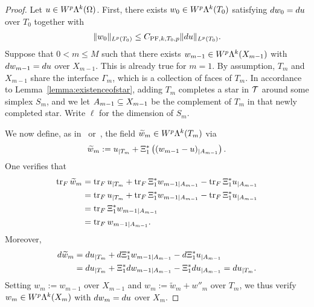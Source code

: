 \documentclass[10pt,a4paper]{article}
\begin{document}
\begin{proof}
    Let $u \in W^{p}\Lambda^{k}(\Omega)$. 
    First, there exists $w_0 \in W^{p}\Lambda^{k}(T_{0})$ satisfying $d w_0 = d u$ over $T_{0}$ together with 
    \begin{gather*}
        \| w_0 \|_{L^{p}(T_{0})} \leq C_{{{\rm PF}},k,T_{0},p} \| d u \|_{L^{p}(T_{0})}.
    \end{gather*}
    Suppose that $0 < m \leq M$ such that there exists $w_{m-1} \in W^{p}\Lambda^{k}(X_{m-1})$ with $d w_{m-1} = d u$ over $X_{m-1}$. 
    This is already true for $m = 1$.
    By assumption, $T_{m}$ and $X_{m-1}$ share the interface $\Gamma_{m}$, which is a collection of faces of $T_{m}$. 
    In accordance to Lemma~\ref{lemma:existenceofstar}, adding $T_{m}$ completes a star in ${\mathcal T}$ around some simplex $S_{m}$, 
    and we let $A_{m-1} \subseteq X_{m-1}$ be the complement of $T_{m}$ in that newly completed star. 
    Write $\ell$ for the dimension of $S_{m}$.
    
    We now define, as in~\cite[Equations~{\char`\(}5.12{\char`\)} and~{\char`\(}5.14{\char`\)}]{ern2020stable} or~\cite[Equations~{\char`\(}6.7{\char`\)} and~{\char`\(}6.9{\char`\)}]{Chaum_Voh_p_rob_3D_H_curl_24}, the field $\widetilde w_{m} \in W^{p}\Lambda^{k}(T_{m})$ via 
    \begin{align}\label{equation:w''_ext_der}
        {\widetilde w}_{m} := u_{|T_m} + \Xi_{1}^{\ast}\left( (w_{m-1} - u)_{|A_{m-1} } \right).
    \end{align}
    One verifies that 
    \begin{align*}
        \operatorname{tr}_F {\widetilde w}_{m} 
        &
        = 
        \operatorname{tr}_F u_{|T_m} + \operatorname{tr}_F \Xi_{1}^{\ast} w_{m-1|A_{m-1} } - \operatorname{tr}_F \Xi_{1}^{\ast} u_{|A_{m-1} } 
        \\&
        = 
        \operatorname{tr}_F u_{|T_m} + \operatorname{tr}_F \Xi_{1}^{\ast} w_{m-1|A_{m-1} } - \operatorname{tr}_F \Xi_{1}^{\ast} u_{|A_{m-1} } 
        \\&
        = 
        \operatorname{tr}_F \Xi_{1}^{\ast} w_{m-1|A_{m-1} }
        \\&
        = 
        \operatorname{tr}_F w_{m-1|A_{m-1}}
        .
    \end{align*}
    Moreover, 
    \begin{align*}
        d {\widetilde w}_{m} 
        &
        = 
        d u_{|T_m} + d \Xi_{1}^{\ast} w_{m-1|A_{m-1} } - d \Xi_{1}^{\ast} u_{|A_{m-1} } 
        \\&
        = 
        d u_{|T_m} + \Xi_{1}^{\ast} d w_{m-1|A_{m-1} } - \Xi_{1}^{\ast} d u_{|A_{m-1} } 
        = 
        d u_{|T_m}
        .
    \end{align*}
    Setting $w_{m} := w_{m-1}$ over $X_{m-1}$ and $w_{m} := {\widetilde w}_{m} + w''_{m}$ over $T_{m}$, 
    we thus verify $w_{m} \in W^{p}\Lambda^{k}(X_{m})$ with $d w_{m} = d u$ over $X_{m}$. 
    

\end{proof}
\end{document}
